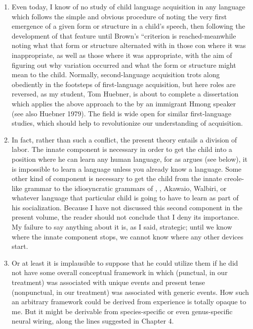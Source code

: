 \begin{enumerate}
\item Even today, I know of no study of child language acquisition in any language which follows the simple and obvious procedure of noting the very first emergence of a given form or structure in a child's speech, then following the development of that feature until Brown's ``criterion is reached-meanwhile noting what that form or structure alternated with in those con where it was inappropriate, as well as those where it was appropriate, with the aim of figuring out why variation occurred and what the form or structure might mean to the child. Normally, second-language acquisition trots along obediently in the footsteps of first-language acquisition, but here roles are reversed, as my student, Tom Huebner, is about to complete a dissertation which applies the above approach to the   by an immi\-grant Hmong speaker (see also Huebner 1979). The field is wide open for similar first-language studies, which should help to revolutionize our understanding of acquisition.
\item In fact, rather than such a conflict, the present theory entails a division of labor. The innate component is necessary in order to get the child into a position where he can learn any human language, for as \citet{Fodor1975} argues (see below), it is impossible to learn a language unless you already know a language. Some other kind of component is necessary to get the child from the innate creole-like grammar to the idiosyncratic grammars of , , Akawaio, Walbiri, or what\-ever language that particular child is going to have to learn as part of his socialization. Because I have not discussed this second component in the present volume, the reader should not conclude that I deny its 
importance. My failure to say anything about it is, as I said, strategic; until we know where the innate component stops, we cannot know where any other devices start.
\item Or at least it is implausible to suppose that he could utilize them if he did not have some overall conceptual framework in which  (punctual, in our treatment) was associated with unique events and present tense (nonpunctual, in our treatment) was associ\-ated with generic events. How such an arbitrary framework could be derived from experience is totally opaque to me. But it might be derivable from species-specific or even genus-specific neural wiring, along the lines suggested in Chapter 4.

\end{enumerate}
